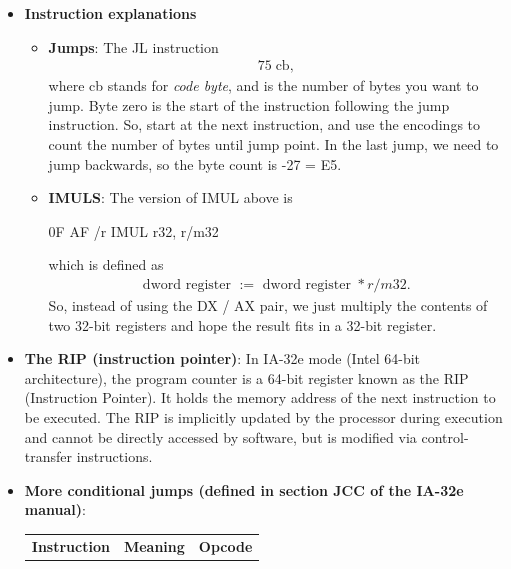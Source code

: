 \documentclass{report}
\begin{document}
\begin{itemize}
        \item \textbf{Instruction explanations}
            \begin{itemize}
                \item \textbf{Jumps}: The JL instruction 
                    \begin{align*}
                        75\; \text{cb}
                    ,\end{align*}
                    where cb stands for \textit{code byte}, and is the number of bytes you want to jump. Byte zero is the start of the instruction following the jump instruction. So, start at the next instruction, and use the encodings to count the number of bytes until jump point.
                    \bigbreak \noindent 
                    In the last jump, we need to jump backwards, so the byte count is -27 = E5.
                    \bigbreak \noindent 
                \item \textbf{IMULS}: The version of IMUL above is 
                    \bigbreak \noindent 
                    \begin{cppcode}
                    0F AF /r   IMUL r32, r/m32
                    \end{cppcode}
                    \bigbreak \noindent 
                    which is defined as 
                    \begin{align*}
                        \text{dword register } :=  \text{ dword register } * r /m32
                    .\end{align*}
                    So, instead of using the DX / AX pair, we just multiply the contents of two 32-bit registers and hope the result fits in a 32-bit register.
            \end{itemize}
        \item \textbf{The RIP (instruction pointer)}: In IA-32e mode (Intel 64-bit architecture), the program counter is a 64-bit register known as the RIP (Instruction Pointer). It holds the memory address of the next instruction to be executed. The RIP is implicitly updated by the processor during execution and cannot be directly accessed by software, but is modified via control-transfer instructions.
        \item \textbf{More conditional jumps (defined in section JCC of the IA-32e manual)}:
            \begin{center}
                \begin{tabularx}{\textwidth}{@{}XXX@{}}
                    \toprule
                    \textbf{Instruction} & \textbf{Meaning} & \textbf{Opcode} \\

\end{tabularx}
\end{center}
\end{itemize}
\end{document}
